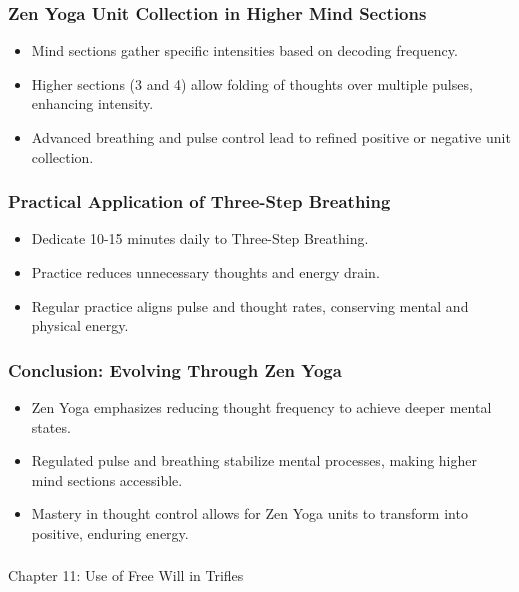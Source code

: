 \begin{frame}[fragile]\frametitle{Zen Yoga Unit Collection in Higher Mind Sections}
    \begin{itemize}
        \item Mind sections gather specific intensities based on decoding frequency.
        \item Higher sections (3 and 4) allow folding of thoughts over multiple pulses, enhancing intensity.
        \item Advanced breathing and pulse control lead to refined positive or negative unit collection.
    \end{itemize}
\end{frame}

\begin{frame}[fragile]\frametitle{Practical Application of Three-Step Breathing}
    \begin{itemize}
        \item Dedicate 10-15 minutes daily to Three-Step Breathing.
        \item Practice reduces unnecessary thoughts and energy drain.
        \item Regular practice aligns pulse and thought rates, conserving mental and physical energy.
    \end{itemize}
\end{frame}

\begin{frame}[fragile]\frametitle{Conclusion: Evolving Through Zen Yoga}
    \begin{itemize}
        \item Zen Yoga emphasizes reducing thought frequency to achieve deeper mental states.
        \item Regulated pulse and breathing stabilize mental processes, making higher mind sections accessible.
        \item Mastery in thought control allows for Zen Yoga units to transform into positive, enduring energy.
    \end{itemize}
\end{frame}

\begin{frame}[fragile]\frametitle{}
\begin{center}
{\Large Chapter 11: Use of Free Will in Trifles }
\end{center}
\end{frame}

